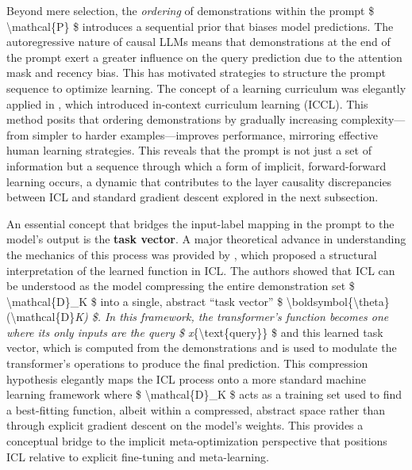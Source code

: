 \documentclass[11pt]{article}
\begin{document}
Beyond mere selection, the \emph{ordering} of demonstrations within the prompt \$ \textbackslash mathcal\{P\} \$ introduces a sequential prior that biases model predictions. The autoregressive nature of causal LLMs means that demonstrations at the end of the prompt exert a greater influence on the query prediction due to the attention mask and recency bias. This has motivated strategies to structure the prompt sequence to optimize learning. The concept of a learning curriculum was elegantly applied in \cite{ref21}, which introduced in-context curriculum learning (ICCL). This method posits that ordering demonstrations by gradually increasing complexity---from simpler to harder examples---improves performance, mirroring effective human learning strategies. This reveals that the prompt is not just a set of information but a sequence through which a form of implicit, forward-forward learning occurs, a dynamic that contributes to the layer causality discrepancies between ICL and standard gradient descent explored in the next subsection.

An essential concept that bridges the input-label mapping in the prompt to the model's output is the \textbf{task vector}. A major theoretical advance in understanding the mechanics of this process was provided by \cite{ref22}, which proposed a structural interpretation of the learned function in ICL. The authors showed that ICL can be understood as the model compressing the entire demonstration set \$ \textbackslash mathcal\{D\}\_K \$ into a single, abstract ``task vector'' \$ \textbackslash boldsymbol\{\textbackslash theta\}(\textbackslash mathcal\{D\}\emph{K) \$. In this framework, the transformer's function becomes one where its only inputs are the query \$ x}\{\textbackslash text\{query\}\} \$ and this learned task vector, which is computed from the demonstrations and is used to modulate the transformer's operations to produce the final prediction. This compression hypothesis elegantly maps the ICL process onto a more standard machine learning framework where \$ \textbackslash mathcal\{D\}\_K \$ acts as a training set used to find a best-fitting function, albeit within a compressed, abstract space rather than through explicit gradient descent on the model's weights. This provides a conceptual bridge to the implicit meta-optimization perspective that positions ICL relative to explicit fine-tuning and meta-learning.
\end{document}
